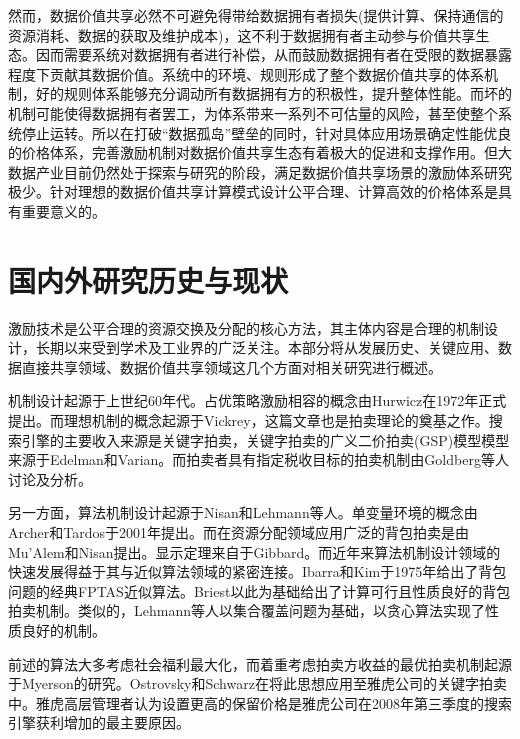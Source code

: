 \documentclass[promaster]{thesis-uestc}
\begin{document}
然而，数据价值共享必然不可避免得带给数据拥有者损失(提供计算、保持通信的资源消耗、数据的获取及维护成本)，这不利于数据拥有者主动参与价值共享生态。因而需要系统对数据拥有者进行补偿，从而鼓励数据拥有者在受限的数据暴露程度下贡献其数据价值。系统中的环境、规则形成了整个数据价值共享的体系机制，好的规则体系能够充分调动所有数据拥有方的积极性，提升整体性能。而坏的机制可能使得数据拥有者罢工，为体系带来一系列不可估量的风险，甚至使整个系统停止运转。所以在打破“数据孤岛”壁垒的同时，针对具体应用场景确定性能优良的价格体系，完善激励机制对数据价值共享生态有着极大的促进和支撑作用。但大数据产业目前仍然处于探索与研究的阶段，满足数据价值共享场景的激励体系研究极少。针对理想的数据价值共享计算模式设计公平合理、计算高效的价格体系是具有重要意义的。


\section{国内外研究历史与现状}

激励技术是公平合理的资源交换及分配的核心方法，其主体内容是合理的机制设计，长期以来受到学术及工业界的广泛关注。本部分将从发展历史、关键应用、数据直接共享领域、数据价值共享领域这几个方面对相关研究进行概述。

机制设计起源于上世纪60年代。占优策略激励相容的概念由Hurwicz在1972年正式提出。而理想机制的概念起源于Vickrey，这篇文章也是拍卖理论的奠基之作。搜索引擎的主要收入来源是关键字拍卖，关键字拍卖的广义二价拍卖(GSP)模型模型来源于Edelman和Varian。而拍卖者具有指定税收目标的拍卖机制由Goldberg等人讨论及分析。

另一方面，算法机制设计起源于Nisan和Lehmann等人。单变量环境的概念由Archer和Tardos于2001年提出。而在资源分配领域应用广泛的背包拍卖是由Mu'Alem和Nisan提出。显示定理来自于Gibbard。而近年来算法机制设计领域的快速发展得益于其与近似算法领域的紧密连接。Ibarra和Kim于1975年给出了背包问题的经典FPTAS近似算法。Briest以此为基础给出了计算可行且性质良好的背包拍卖机制。类似的，Lehmann等人以集合覆盖问题为基础，以贪心算法实现了性质良好的机制。

前述的算法大多考虑社会福利最大化，而着重考虑拍卖方收益的最优拍卖机制起源于Myerson的研究。Ostrovsky和Schwarz在将此思想应用至雅虎公司的关键字拍卖中。雅虎高层管理者认为设置更高的保留价格是雅虎公司在2008年第三季度的搜索引擎获利增加的最主要原因。
\end{document}
